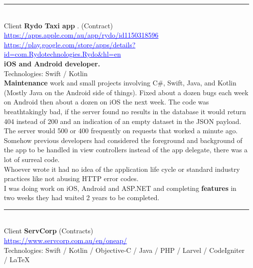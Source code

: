 \documentclass{article}
\begin{document}
\noindent\hfil\rule{0.5\textwidth}{.4pt}\hfil
\\

Client    \textbf  {Rydo Taxi app }.  (Contract)  \\
 \textcolor{blue} { \underline{https://apps.apple.com/au/app/rydo/id1150318596 } } \\
 \textcolor{blue} { \underline{https://play.google.com/store/apps/details?id=com.Rydotechnologies.Rydo\&hl=en  }}   \\
\textbf{  iOS and Android developer. }\\
Technologies: Swift / Kotlin \\


{\bf Maintenance} work and small projects involving C\#, Swift, Java, and Kotlin (Mostly Java on the Android side of things).   Fixed about a dozen bugs each week on Android then about a dozen on iOS the next week. The code was breathtakingly bad, if the server found no results in the database it would return 404 instead of 200 and an indication of an empty dataset in the JSON payload. \\ The server would 500 or 400 frequently on requests that worked a minute ago. \\

Somehow previous developers had considered the foreground and background of the app to be handled in view controllers instead of the app delegate, there was a lot of surreal code. \\
Whoever wrote it had no idea of the application life cycle or standard industry practices like not abusing HTTP error codes. \\
 
I was doing work on iOS, Android and ASP.NET and completing {\bf features} in two weeks they had waited 2 years to be completed.  \\

\noindent\hfil\rule{0.5\textwidth}{.4pt}\hfil
\\

Client    \textbf  { ServCorp} (Contracts) \\ 
\textcolor{blue} { \underline{https://www.servcorp.com.au/en/oneap/ }} \\
Technologies: Swift / Kotlin / Objective-C / Java / PHP / Larvel / CodeIgniter / \LaTeX \\
\end{document}
